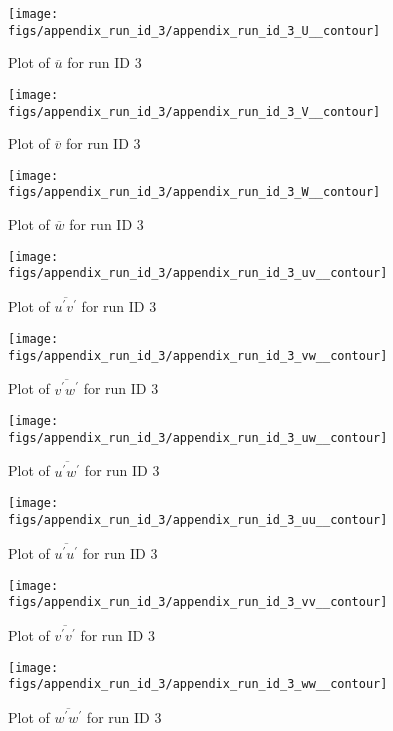 \begin{figure}[H]
\centering
\texttt{[image: figs/appendix\_run\_id\_3/appendix\_run\_id\_3\_U\_\_contour]}
\caption{Plot of $\overline{u}$ for run ID 3}
\label{fig:appendix_run_id_3_U__contour}
\end{figure}


\begin{figure}[H]
\centering
\texttt{[image: figs/appendix\_run\_id\_3/appendix\_run\_id\_3\_V\_\_contour]}
\caption{Plot of $\overline{v}$ for run ID 3}
\label{fig:appendix_run_id_3_V__contour}
\end{figure}


\begin{figure}[H]
\centering
\texttt{[image: figs/appendix\_run\_id\_3/appendix\_run\_id\_3\_W\_\_contour]}
\caption{Plot of $\overline{w}$ for run ID 3}
\label{fig:appendix_run_id_3_W__contour}
\end{figure}


\begin{figure}[H]
\centering
\texttt{[image: figs/appendix\_run\_id\_3/appendix\_run\_id\_3\_uv\_\_contour]}
\caption{Plot of $\overline{u^\prime v^\prime}$ for run ID 3}
\label{fig:appendix_run_id_3_uv__contour}
\end{figure}


\begin{figure}[H]
\centering
\texttt{[image: figs/appendix\_run\_id\_3/appendix\_run\_id\_3\_vw\_\_contour]}
\caption{Plot of $\overline{v^\prime w^\prime}$ for run ID 3}
\label{fig:appendix_run_id_3_vw__contour}
\end{figure}


\begin{figure}[H]
\centering
\texttt{[image: figs/appendix\_run\_id\_3/appendix\_run\_id\_3\_uw\_\_contour]}
\caption{Plot of $\overline{u^\prime w^\prime}$ for run ID 3}
\label{fig:appendix_run_id_3_uw__contour}
\end{figure}


\begin{figure}[H]
\centering
\texttt{[image: figs/appendix\_run\_id\_3/appendix\_run\_id\_3\_uu\_\_contour]}
\caption{Plot of $\overline{u^\prime u^\prime}$ for run ID 3}
\label{fig:appendix_run_id_3_uu__contour}
\end{figure}


\begin{figure}[H]
\centering
\texttt{[image: figs/appendix\_run\_id\_3/appendix\_run\_id\_3\_vv\_\_contour]}
\caption{Plot of $\overline{v^\prime v^\prime}$ for run ID 3}
\label{fig:appendix_run_id_3_vv__contour}
\end{figure}


\begin{figure}[H]
\centering
\texttt{[image: figs/appendix\_run\_id\_3/appendix\_run\_id\_3\_ww\_\_contour]}
\caption{Plot of $\overline{w^\prime w^\prime}$ for run ID 3}
\label{fig:appendix_run_id_3_ww__contour}
\end{figure}


